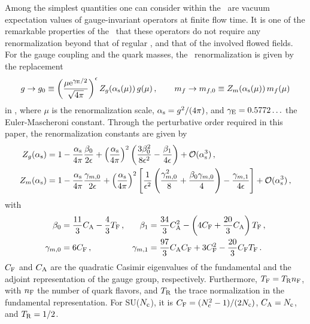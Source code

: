 \label{sec:observables}

Among the simplest quantities one can consider within the \gff\ are
vacuum expectation values of gauge-invariant operators at finite flow
time. It is one of the remarkable properties of the \gff\ that these
operators do not require any renormalization beyond that of regular
\qcd, and that of the involved flowed fields. For the gauge coupling and
the quark masses, the \msbar\ renormalization is given by the
replacement
\begin{equation}
  \begin{split}
    g\to g_0\equiv \left(\frac{\mu\mathrm{e}^{\gamma_\mathrm{E}/2}}{\sqrt{4\pi}}\right)^\epsilon
    Z_g(\alpha_\mathrm{s}(\mu))\,g(\mu)\,,\qquad m_f\to m_{f,0}\equiv
    Z_m(\alpha_\mathrm{s}(\mu))\,m_f(\mu)
    \label{eq:renorm}
  \end{split}
\end{equation}
in , where $\mu$ is the renormalization scale,
$\alpha_\mathrm{s}=g^2/(4\pi)$, and $\gamma_\mathrm{E}=0.5772\ldots$ the
Euler-Mascheroni constant.  Through the perturbative order required in
this paper, the renormalization constants are given by
\begin{equation}
  \begin{split}
    Z_g(\alpha_\mathrm{s}) &=
    1 -
    \frac{\alpha_\mathrm{s}}{4\pi}\frac{\beta_0}{2\epsilon} +
    \left(\frac{\alpha_\mathrm{s}}{4\pi}\right)^2\left(\frac{3\beta_0^2}{8\epsilon^2}
    -\frac{\beta_1}{4\epsilon}\right) + {\cal O}(\alpha_\mathrm{s}^3)\,, \\ Z_m(\alpha_\mathrm{s}) &=
    1 -\frac{\alpha_\mathrm{s}}{4\pi}\frac{\gamma_{m,0}}{2\epsilon}
    +\left(\frac{\alpha_\mathrm{s}}{4\pi}\right)^2\left[\frac{1}{\epsilon^2}\left(
      \frac{\gamma_{m,0}^2}{8} + \frac{\beta_0\gamma_{m,0}}{4}\right)
      -\frac{\gamma_{m,1}}{4\epsilon}\right] + {\cal O}(\alpha_\mathrm{s}^3)\,,
    \label{eq:rgconsts}
  \end{split}
\end{equation}
with
\begin{equation}
\begin{aligned}
      \beta_0 &= \frac{11}{3} C_\mathrm{A} - \frac{4}{3} T_\mathrm{F}\,, &
      \beta_1 &= \frac{34}{3} C_\mathrm{A}^2 - \left( 4 C_\mathrm{F} + \frac{20}{3} C_\mathrm{A}
      \right) T_\mathrm{F} \,,\\
      \gamma_{m,0} &= 6 C_\mathrm{F}\,, &
      \gamma_{m,1} &= \frac{97}{3} C_\mathrm{A} C_\mathrm{F} + 3 C_\mathrm{F}^2
      - \frac{20}{3} C_\mathrm{F} T_\mathrm{F} \,.
    \label{eq:anombg}
\end{aligned}
\end{equation}
$C_\mathrm{F}$ and $C_\mathrm{A}$ are the quadratic Casimir eigenvalues of the fundamental
and the adjoint representation of the gauge group,
respectively. Furthermore, $T_\mathrm{F}=T_\mathrm{R} n_\mathrm{F}$, with $n_\mathrm{F}$ the number of quark
flavors, and $T_\mathrm{R}$ the trace normalization in the fundamental
representation. For SU($N_\mathrm{c}$), it is $C_\mathrm{F}=(N_\mathrm{c}^2-1)/(2N_\mathrm{c})$, $C_\mathrm{A}=N_\mathrm{c}$,
and $T_\mathrm{R}=1/2$.

